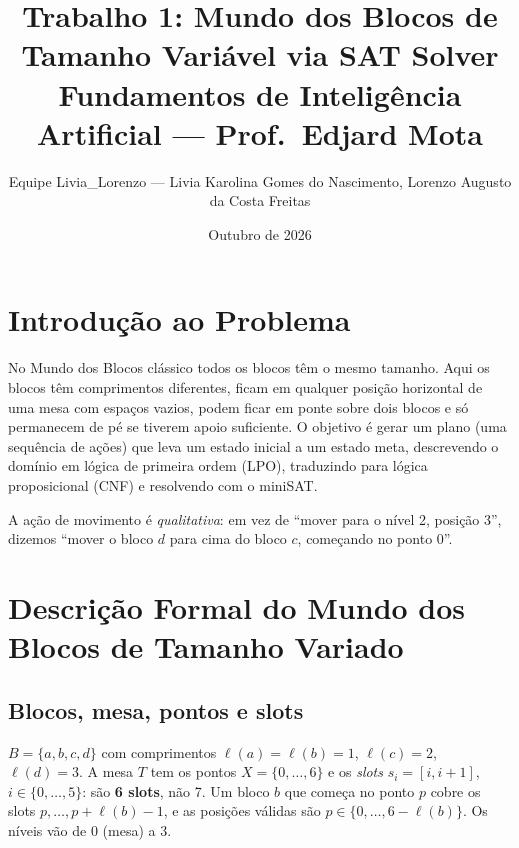 \documentclass[11pt,a4paper]{article}
\title{Trabalho 1: Mundo dos Blocos de Tamanho Vari\'avel via SAT Solver\\
\large Fundamentos de Intelig\^encia Artificial --- Prof.\ Edjard Mota}
\author{Equipe Livia\_Lorenzo --- Livia Karolina Gomes do Nascimento, Lorenzo Augusto da Costa Freitas}
\date{Outubro de 2026}
\begin{document}
\maketitle
\tableofcontents

\section{Introdu\c{c}\~ao ao Problema}
No Mundo dos Blocos cl\'assico todos os blocos t\^em o mesmo tamanho. Aqui os blocos t\^em comprimentos diferentes, ficam em qualquer posi\c{c}\~ao horizontal de uma mesa com espa\c{c}os vazios, podem ficar em ponte sobre dois blocos e s\'o permanecem de p\'e se tiverem apoio suficiente. O objetivo \'e gerar um plano (uma sequ\^encia de a\c{c}\~oes) que leva um estado inicial a um estado meta, descrevendo o dom\'inio em l\'ogica de primeira ordem (LPO), traduzindo para l\'ogica proposicional (CNF) e resolvendo com o miniSAT.

A a\c{c}\~ao de movimento \'e \emph{qualitativa}: em vez de ``mover para o n\'ivel 2, posi\c{c}\~ao 3'', dizemos ``mover o bloco $d$ para cima do bloco $c$, come\c{c}ando no ponto 0''.

\section{Descri\c{c}\~ao Formal do Mundo dos Blocos de Tamanho Variado}
\subsection{Blocos, mesa, pontos e slots}
$B=\{a,b,c,d\}$ com comprimentos $\ell(a)=\ell(b)=1$, $\ell(c)=2$, $\ell(d)=3$. A mesa $T$ tem os pontos $X=\{0,\dots,6\}$ e os \emph{slots} $s_i=[i,i+1]$, $i\in\{0,\dots,5\}$: s\~ao \textbf{6 slots}, n\~ao 7. Um bloco $b$ que come\c{c}a no ponto $p$ cobre os slots $p,\dots,p+\ell(b)-1$, e as posi\c{c}\~oes v\'alidas s\~ao $p\in\{0,\dots,6-\ell(b)\}$. Os n\'iveis v\~ao de 0 (mesa) a 3.
\end{document}
